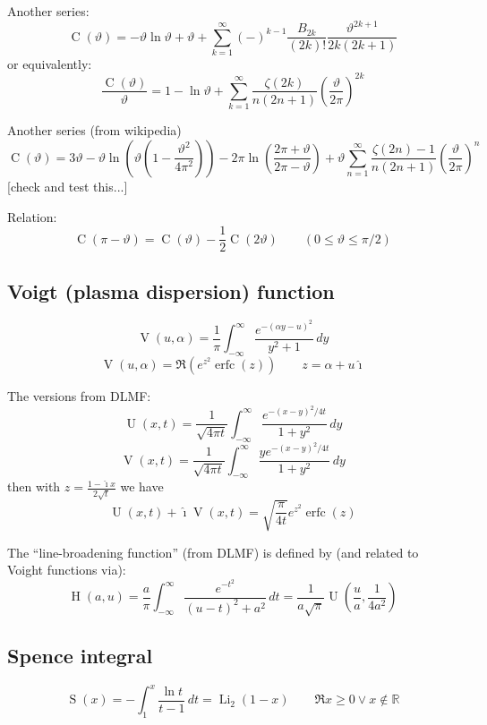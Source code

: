 \documentclass[10pt,dvipdfmx,letterpaper,twoside]{article}
\DeclareMathOperator{\erfc}{erfc}
\let\O=\operatorname
\newcommand{\RR}{{\mathbb{R}}}
\newcommand{\ii}{{\hat{\imath}}}
\let\al=\alpha
\let\theta=\vartheta
\begin{document}
Another series:
\[ \O{C}(\theta) = -\theta\ln\theta + \theta + \sum_{k=1}^\infty(-)^{k-1}\frac{B_{2k}}{(2k)!}\frac{\theta^{2k+1}}{2k(2k+1)} \]
or equivalently:
\[ \frac{\O{C}(\theta)}{\theta} = 1 - \ln\theta + \sum_{k=1}^\infty\frac{\zeta(2k)}{n(2n+1)}\left(\frac{\theta}{2\pi}\right)^{2k} \]

Another series (from wikipedia)
\[ \O{C}(\theta) = 3\theta - \theta\ln\left(\theta(1-\frac{\theta^2}{4\pi^2})\right)
    -2\pi\ln(\frac{2\pi+\theta}{2\pi-\theta}) + \theta\sum_{n=1}^\infty \frac{\zeta(2n)-1}{n(2n+1)}\left(\frac{\theta}{2\pi}\right)^{n} \]
[check and test this...]

Relation:
\[ \O{C}(\pi-\theta) = \O{C}(\theta) - \frac12\O{C}(2\theta) \qquad (0\leq\theta\leq\pi/2) \]

\subsection{Voigt (plasma dispersion) function}
\[ \O{V}(u,\al) = \frac1\pi \int_{-\infty}^\infty \frac{e^{-(\al y-u)^2}}{y^2+1}\,dy \]
\[ \O{V}(u,\al) = \Re(e^{z^2}\erfc(z)) \qquad z=\al+u\ii \]

The versions from DLMF:
\[ \O{U}(x,t) = \frac{1}{\sqrt{4\pi t}} \int_{-\infty}^\infty \frac{e^{-(x-y)^2/4t}}{1 + y^2}\,dy \]
\[ \O{V}(x,t) = \frac{1}{\sqrt{4\pi t}} \int_{-\infty}^\infty \frac{y e^{-(x-y)^2/4t}}{1 + y^2}\,dy \]
then with $z=\frac{1-\ii x}{2\sqrt{t}}$ we have
\[ \O{U}(x,t) + \ii\O{V}(x,t) = \sqrt{\frac{\pi}{4t}}e^{z^2}\erfc(z) \]

The ``line-broadening function'' (from DLMF) is defined by (and related to Voight functions via):
\[ \O{H}(a,u) = \frac{a}{\pi}\int_{-\infty}^\infty\frac{e^{-t^2}}{(u-t)^2 + a^2}\,dt
    = \frac{1}{a\sqrt\pi} \O{U}(\frac{u}{a}, \frac{1}{4a^2}) \]

\subsection{Spence integral}
\[ \O{S}(x) = -\int_1^x\frac{\ln t}{t-1}\,dt = \O{Li}_2(1-x) \qquad \Re{x}\geq0 \vee x\notin\RR\]
\end{document}
